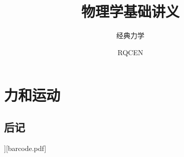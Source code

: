 \documentclass[color=red,openany]{textbook-cn}%
\title{物理学基础讲义}
\subtitle{经典力学}
\author{RQCEN}
\begin{document}
\MainFont

\makecover
\maketitle

\lipsum

\frontmatter





\tableofcontents*

\listoffigures
%
\mainmatter

\part{力和运动}







%
%
%
%
%
%
%
%
%
%
%
%
%


\backmatter

%	

\chapter{后记}

\lipsum

\makeback[\lipsum[2]][barcode.pdf]

\end{document}
